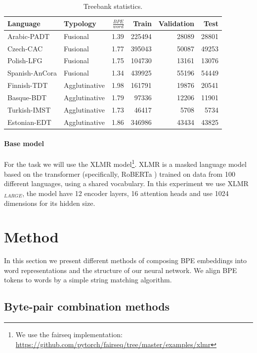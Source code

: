 \documentclass[11pt]{article}
\begin{document}
    	\begin{table}[h]
		\centering
		\begin{tabular}{l|lrrrr}
			Language & Typology & $\frac{BPE}{word}$ & Train & Validation & Test \\
			\hline
			Arabic-PADT  & Fusional & 1.39 & 225494 & 28089 & 28801  \\
			Czech-CAC   & Fusional & 1.77 & 395043 & 50087 & 49253 \\
			Polish-LFG & Fusional & 1.75 & 104730 & 13161 & 13076 \\
			Spanish-AnCora & Fusional & 1.34 & 439925 & 55196 & 54449 \\
			Finnish-TDT & Agglutinative & 1.98 & 161791 & 19876 & 20541 \\
			Basque-BDT  & Agglutinative & 1.79 & 97336 & 12206 & 11901 \\
			Turkish-IMST & Agglutinative & 1.73 & 46417 & 5708 & 5734 \\
			Estonian-EDT & Agglutinative & 1.86 & 346986 & 43434 & 43825 \\
		\end{tabular}
		\caption{\label{tab:data} Treebank statistics.}
	\end{table}
    
    \paragraph{Base model}
    
	For the task we will use the XLMR \citep{conneau2019unsupervised} model\footnote{We use the fairseq implementation: \url{https://github.com/pytorch/fairseq/tree/master/examples/xlmr}}. XLMR is a masked language model based on the transformer (specifically, RoBERTa \citep{liu2019roberta}) trained on data from 100 different languages, using a shared vocabulary. In this experiment we use \textsc{XLMR}$_{LARGE}$, the model have 12 encoder layers, 16 attention heads and use 1024 dimensions for its hidden size.
	
	\section{Method}
	\label{method}
	
	In this section we present different methods of composing BPE embeddings into word representations and the structure of our neural network. We align BPE tokens to words by a simple string matching algorithm. 
	
	\subsection{Byte-pair combination methods}
	
\end{document}
